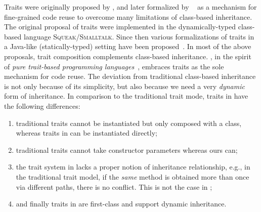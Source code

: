 Traits were originally proposed by \citet{scharli2003traits}, and later formalized by ~\cite{Ducasse_2006} as a mechanism
for fine-grained code reuse to overcome many limitations of class-based
inheritance. The original proposal of traits were implemented in the
dynamically-typed class-based language \textsc{Squeak/Smalltalk}. Since then
various formalizations of traits in a Java-like (statically-typed) setting have
been proposed~\citep{fisher2004typed,scharli2003traitsformal,chai_trait,
  JOT:issue_2006_05/article4}. In most of the above proposals, trait composition
complements class-based inheritance. \sedel, in the spirit of \emph{pure trait-based programming languages}~\citep{BETTINI2013521, BETTINI2017419},
embraces traits as the sole mechanism for code reuse. The deviation from
traditional class-based inheritance is not only because of its simplicity, but
also because we need a very \emph{dynamic} form of inheritance. In comparison to
the traditional trait mode, traits in \sedel have the following differences:
\begin{enumerate}
\item traditional traits cannot be instantiated but only composed with a class,
  whereas traits in \sedel can be instantiated directly;
\item traditional traits cannot take constructor parameters whereas ours can;
\item the trait system in \sedel lacks a proper notion of inheritance
  relationship, e.g., in the traditional trait model, if the \emph{same}
  method is obtained more than once via different paths, there is no conflict.
  This is not the case in \sedel;
\item and finally traits in \sedel are first-class and support dynamic
  inheritance.
\end{enumerate}




